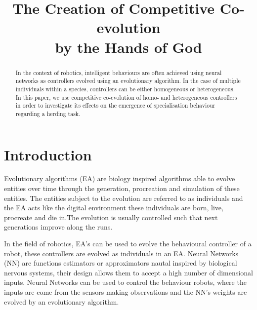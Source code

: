\documentclass[conference]{IEEEtran}
\begin{document}
\title{The Creation of Competitive Co-evolution \\ by the Hands of God}



\author{
}



\maketitle


\begin{abstract}
In the context of robotics, intelligent behaviours are often achieved using neural networks as controllers evolved using  an evolutionary algorithm.
In the case of multiple individuals within a species, controllers can be either homogeneous or heterogeneous.
In this paper, we use competitive co-evolution of homo- and heterogeneous controllers in order to investigate its effects on the emergence of specialisation behaviour regarding a herding task.
\end{abstract}


\IEEEpeerreviewmaketitle


\section{Introduction}
Evolutionary algorithms (EA) are biology inspired algorithms able to evolve entities over time through the generation, procreation and simulation of these entities. The entities subject to the evolution are referred to as individuals and the EA acts like the digital environment these individuals are born, live, procreate and die in.The evolution is usually controlled such that next generations improve along the runs.

In the field of robotics, EA's can be used to evolve the behavioural controller of a robot, these controllers are evolved as individuals in an EA.
Neural Networks (NN) are functions estimators or approximators nautal inspired by biological nervous systems, their design allows them to accept a high number of dimensional inputs. Neural Networks can be used to control the behaviour robots, where the inputs are come from the sensors making observations and the NN's weights are evolved by an evolutionary algorithm.
\end{document}
